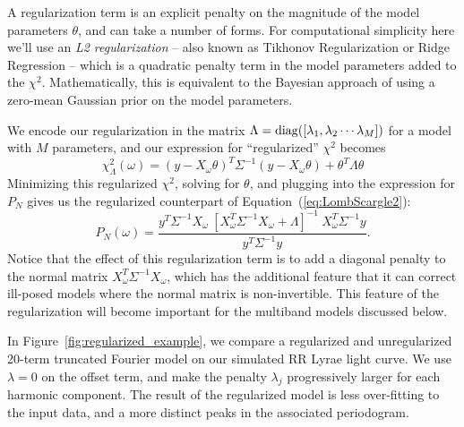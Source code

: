 \documentclass[12pt,preprint]{aastex}
\newcommand{\Fig}[1]{Figure~\ref{fig:#1}}
\newcommand{\fig}[1]{\Fig{#1}}
\newcommand{\Eq}[1]{Equation~(\ref{eq:#1})}
\newcommand{\eq}[1]{\Eq{#1}}
\newcommand{\eqlabel}[1]{\label{eq:#1}}
\begin{document}
A regularization term is an explicit penalty on the magnitude of the model parameters $\theta$, and can take a number of forms. For computational simplicity here we'll use an {\it L2 regularization} -- also known as Tikhonov Regularization \citep{Tikhonov1963} or Ridge Regression \citep{Hoerl1970} -- which is a quadratic penalty term in the model parameters added to the $\chi^2$. Mathematically, this is equivalent to the Bayesian approach of using a zero-mean Gaussian prior on the model parameters.

We encode our regularization in the matrix $\Lambda = {\rm diag}([\lambda_1, \lambda_2 \cdots \lambda_M])$ for a model with $M$ parameters, and our expression for ``regularized'' $\chi^2$ becomes
\begin{equation}
  \eqlabel{chi2reg}
  \chi_\Lambda^2(\omega) = (y - X_\omega\theta)^T\Sigma^{-1}(y - X_\omega\theta) + \theta^T\Lambda\theta
\end{equation}
Minimizing this regularized $\chi^2$, solving for $\theta$, and plugging into the expression for $P_N$ gives us the regularized counterpart of \eq{LombScargle2}:
\begin{equation}
  \eqlabel{LombScargleReg}
  P_N(\omega) = \frac{y^T\Sigma^{-1}X_\omega~[X_\omega^T\Sigma^{-1}X_\omega + \Lambda]^{-1}~X_\omega^T\Sigma^{-1}y}{y^T\Sigma^{-1}y}.
\end{equation}
Notice that the effect of this regularization term is to add a diagonal penalty to the normal matrix $X_\omega^T\Sigma^{-1}X_\omega$, which has the additional feature that it can correct ill-posed models where the normal matrix is non-invertible. This feature of the regularization will become important for the multiband models discussed below.

In \fig{regularized_example}, we compare a regularized and unregularized 20-term truncated Fourier model on our simulated RR Lyrae light curve. We use $\lambda = 0$ on the offset term, and make the penalty $\lambda_j$ progressively larger for each harmonic component. The result of the regularized model is less over-fitting to the input data, and a more distinct peaks in the associated periodogram.
\end{document}

